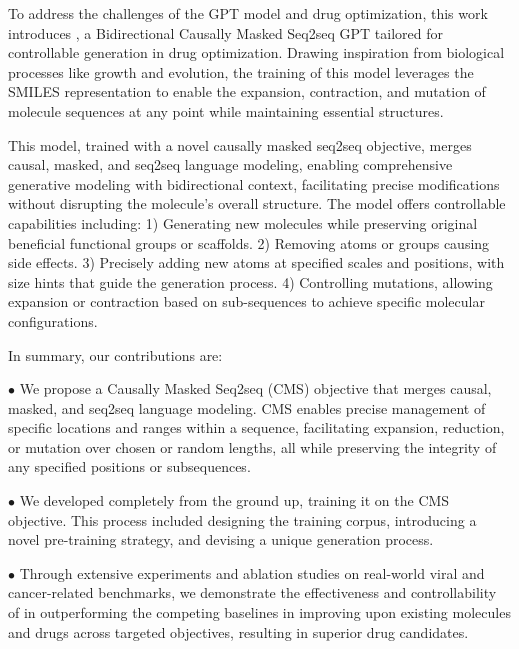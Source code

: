 To address the challenges of the GPT model and drug optimization, this work introduces \algname, a Bidirectional Causally Masked Seq2seq GPT tailored for controllable generation in drug optimization. Drawing inspiration from biological processes like growth and evolution, the training of this model leverages the SMILES representation \citep{weininger1988smiles} to enable the expansion, contraction, and mutation of molecule sequences at any point while maintaining essential structures.

This model, trained with a novel causally masked seq2seq objective, 
merges causal, masked, and seq2seq language modeling, enabling comprehensive generative modeling with bidirectional context, facilitating precise modifications without disrupting the molecule’s overall structure.
The model offers controllable capabilities including:
1) Generating new molecules while preserving original beneficial functional groups or scaffolds.
2) Removing atoms or groups causing side effects.
3) Precisely adding new atoms at specified scales and positions, with size hints that guide the generation process.
4) Controlling mutations, allowing expansion or contraction based on sub-sequences to achieve specific molecular configurations.


In summary, our contributions are:

$\bullet$ We propose a Causally Masked Seq2seq (CMS) objective that merges causal, masked, and seq2seq language modeling. CMS enables precise management of specific locations and ranges within a sequence, facilitating expansion, reduction, or mutation over chosen or random lengths, all while preserving the integrity of any specified positions or subsequences.


$\bullet$  We developed \algname completely from the ground up, training it on the CMS objective. This process included designing the training corpus, introducing a novel pre-training strategy, and devising a unique generation process.

$\bullet$  Through extensive experiments and ablation studies on real-world viral and cancer-related benchmarks, we demonstrate the effectiveness and controllability of \algname in outperforming the competing baselines in improving upon existing molecules and drugs across targeted objectives, resulting in superior drug candidates.


